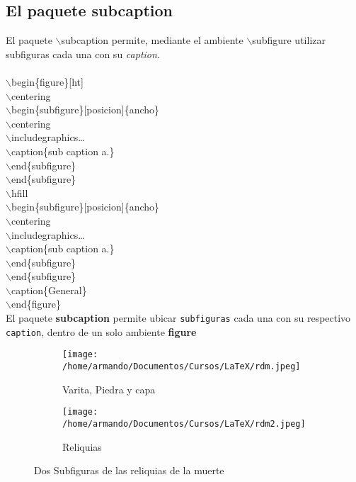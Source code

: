 \documentclass{article}
\begin{document}
	\subsection{El paquete subcaption}
	El paquete \textcolor{myGreen}{$\backslash$subcaption} permite, mediante el ambiente \textcolor{myGreen}{$\backslash$subfigure} utilizar subfiguras cada una con su \textit{caption}.\\\\\textcolor{myGreen}{$\backslash$begin}\{figure\}[ht]\\ \textcolor{myGreen}{$\backslash$centering}\\ \textcolor{myGreen}{$\backslash$begin}\{subfigure\}[posicion]\{ancho\}\\\textcolor{myGreen}{$\backslash$centering}\\\textcolor{myGreen}{$\backslash$includegraphics}\dots\\\textcolor{myGreen}{$\backslash$caption}\{sub caption a.\}\\\textcolor{myGreen}{$\backslash$end}\{subfigure\}\\\textcolor{myGreen}{$\backslash$end}\{subfigure\}\\\textcolor{myGreen}{$\backslash$hfill}\\\textcolor{myGreen}{$\backslash$begin}\{subfigure\}[posicion]\{ancho\}\\\textcolor{myGreen}{$\backslash$centering}\\\textcolor{myGreen}{$\backslash$includegraphics}\dots\\\textcolor{myGreen}{$\backslash$caption}\{sub caption a.\}\\\textcolor{myGreen}{$\backslash$end}\{subfigure\}\\\textcolor{myGreen}{$\backslash$end}\{subfigure\}\\\textcolor{myGreen}{$\backslash$caption}\{General\}\\\textcolor{myGreen}{$\backslash$end}\{figure\}\\
	El paquete \textbf{subcaption} permite ubicar \texttt{subfiguras} cada una con su respectivo \texttt{caption}, dentro de un solo ambiente \textbf{figure}
	\begin{figure}[ht]
		\centering
		\begin{subfigure}[t]{0.475\textwidth}
			\centering
			\texttt{[image: /home/armando/Documentos/Cursos/LaTeX/rdm.jpeg]}
			\caption{Varita, Piedra y capa}
		\end{subfigure}
		\hfill	%
		\begin{subfigure}[t]{0.475\textwidth}
			\centering
			\texttt{[image: /home/armando/Documentos/Cursos/LaTeX/rdm2.jpeg]}
			\caption{Reliquias }
		\end{subfigure}
		\caption{Dos Subfiguras de las reliquias de la muerte}
	\end{figure}
\end{document}
